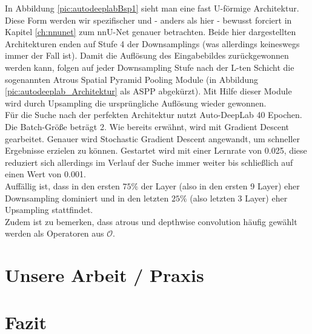In Abbildung \ref{pic:autodeeplabBsp1} sieht man eine fast U-förmige Architektur. Diese Form werden wir spezifischer und - anders als hier - bewusst forciert in Kapitel \ref{ch:nnunet} zum nnU-Net genauer betrachten. Beide hier dargestellten Architekturen enden auf Stufe 4 der Downsamplings (was allerdings keineswegs immer der Fall ist). Damit die Auflösung des Eingabebildes zurückgewonnen werden kann, folgen auf jeder Downsampling Stufe nach der L-ten Schicht die sogenannten Atrous Spatial Pyramid Pooling Module (in Abbildung \ref{pic:autodeeplab_Architektur} als ASPP abgekürzt). Mit Hilfe dieser Module wird durch Upsampling die ursprüngliche Auflösung wieder gewonnen.\\[0.3cm]
Für die Suche nach der perfekten Architektur nutzt Auto-DeepLab 40 Epochen. Die Batch-Größe beträgt 2. Wie bereits erwähnt, wird mit Gradient Descent gearbeitet. Genauer wird Stochastic Gradient Descent angewandt, um schneller Ergebnisse erzielen zu können. Gestartet wird mit einer Lernrate von 0.025, diese reduziert sich allerdings im Verlauf der Suche immer weiter bis schließlich auf einen Wert von 0.001.\\
Auffällig ist, dass in den ersten $75\%$ der Layer (also in den ersten 9 Layer) eher Downsampling dominiert und in den letzten $25\%$ (also letzten 3 Layer) eher Upsampling stattfindet.\\
Zudem ist zu bemerken, dass atrous und depthwise convolution häufig gewählt werden als Operatoren aus $\mathcal{O}$.



\section{Unsere Arbeit / Praxis}


\section{Fazit}

